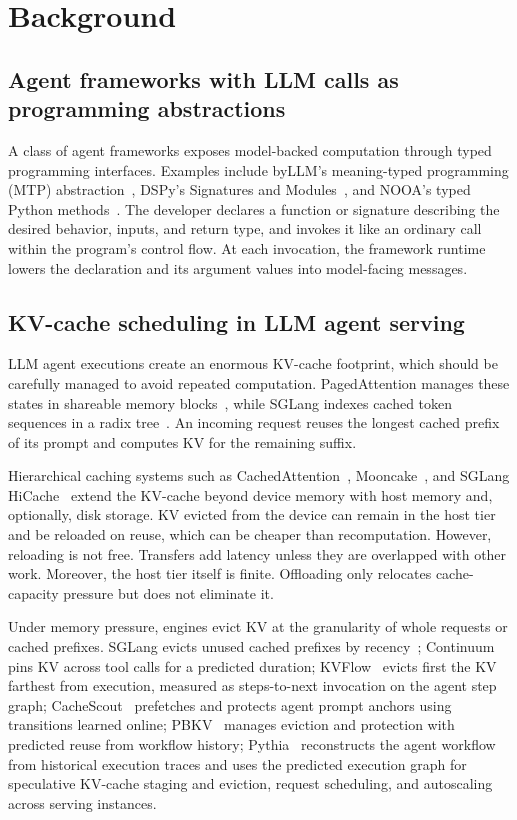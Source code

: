 \section{Background}
\label{sec:background}

\subsection{Agent frameworks with LLM calls as programming abstractions}
A class of agent frameworks exposes model-backed computation through typed programming interfaces. Examples include byLLM's meaning-typed programming (MTP) abstraction~\cite{dantanarayana2025mtp}, DSPy's Signatures and Modules~\cite{khattab2024dspy}, and NOOA's typed Python methods~\cite{furgale2026nooa}. The developer declares a function or signature describing the desired behavior, inputs, and return type, and invokes it like an ordinary call within the program's control flow. At each invocation, the framework runtime lowers the declaration and its argument values into model-facing messages. 

\subsection{KV-cache scheduling in LLM agent serving}
LLM agent executions create an enormous KV-cache footprint, which should be carefully managed to avoid repeated computation. PagedAttention manages these states in shareable memory blocks~\cite{kwon2023pagedattention}, while SGLang indexes cached token sequences in a radix tree~\cite{zheng2024sglang}. An incoming request reuses the longest cached prefix of its prompt and computes KV for the remaining suffix. 

Hierarchical caching systems such as CachedAttention~\cite{gao2024cachedattention}, Mooncake~\cite{qin2025mooncake}, and SGLang HiCache~\cite{sglang2026hicache} extend the KV-cache beyond device memory with host memory and, optionally, disk storage. KV evicted from the device can remain in the host tier and be reloaded on reuse, which can be cheaper than recomputation. However, reloading is not free. Transfers add latency unless they are overlapped with other work. Moreover, the host tier itself is finite. Offloading only relocates cache-capacity pressure but does not eliminate it.

Under memory pressure, engines evict KV at the granularity of whole requests or cached prefixes. SGLang evicts unused cached prefixes by recency~\cite{zheng2024sglang}; Continuum~\cite{li2025continuum} pins KV across tool calls for a predicted duration; KVFlow~\cite{pan2025kvflow} evicts first the KV farthest from execution, measured as steps-to-next invocation on the agent step graph; CacheScout~\cite{zhang2026cachescout} prefetches and protects agent prompt anchors using transitions learned online; PBKV~\cite{zheng2026pbkv} manages eviction and protection with predicted reuse from workflow history; Pythia~\cite{yu2026pythia} reconstructs the agent workflow from historical execution traces and uses the predicted execution graph for speculative KV-cache staging and eviction, request scheduling, and autoscaling across serving instances.
